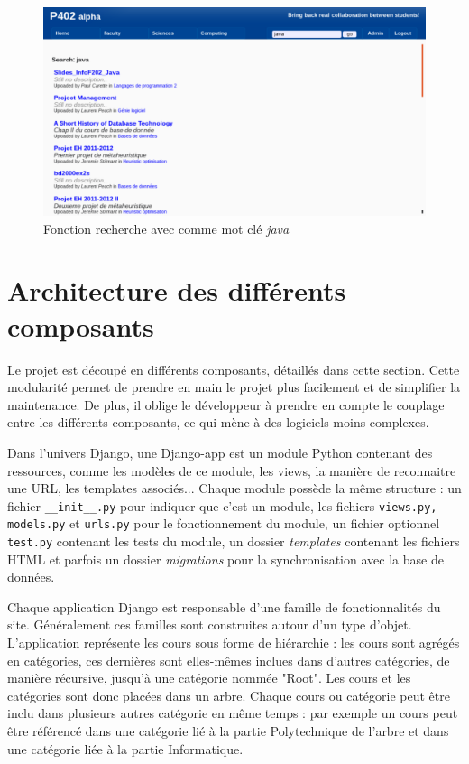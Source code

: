 \documentclass[a4paper,12pt]{article}
\begin{document}
\begin{figure}
  \centering\includegraphics[scale=0.5]{imgs/search.pdf}
  \caption{Fonction recherche avec comme mot clé \textit{java}}
  \label{fig:search}
\end{figure}


\section{Architecture des différents composants}

Le projet est découpé en différents
composants, détaillés dans cette section. Cette modularité permet de prendre en main le projet plus facilement
et de simplifier la maintenance. De plus, il oblige le développeur à
prendre en compte le couplage entre les différents composants, ce qui mène
à des logiciels moins complexes.

Dans l'univers Django, une Django-app est un module Python contenant des
ressources, comme les modèles de ce module, les views, la manière de reconnaitre
une URL, les templates associés... Chaque module possède la même structure : un fichier
\texttt{\_\_init\_\_.py} pour indiquer que c'est un module, les fichiers
\texttt{views.py, models.py} et \texttt{urls.py} pour le fonctionnement du module,
un fichier optionnel \texttt{test.py} contenant les tests du module, un dossier
\textit{templates} contenant les fichiers HTML et parfois un dossier \textit{migrations}
pour la synchronisation avec la base de données.

Chaque application Django est responsable d'une famille de fonctionnalités du site.
Généralement ces familles sont construites autour d'un type d'objet. L'application
représente les cours sous forme de hiérarchie : les cours sont agrégés en catégories,
ces dernières sont elles-mêmes inclues dans d'autres catégories, de manière récursive,
jusqu'à une catégorie nommée "Root". Les cours et les catégories sont donc
placées dans un arbre. Chaque cours ou catégorie peut être inclu dans plusieurs
autres catégorie en même temps : par exemple un cours peut être référencé dans
une catégorie lié à la partie Polytechnique de l'arbre et dans une catégorie liée à la
partie Informatique.
\end{document}
